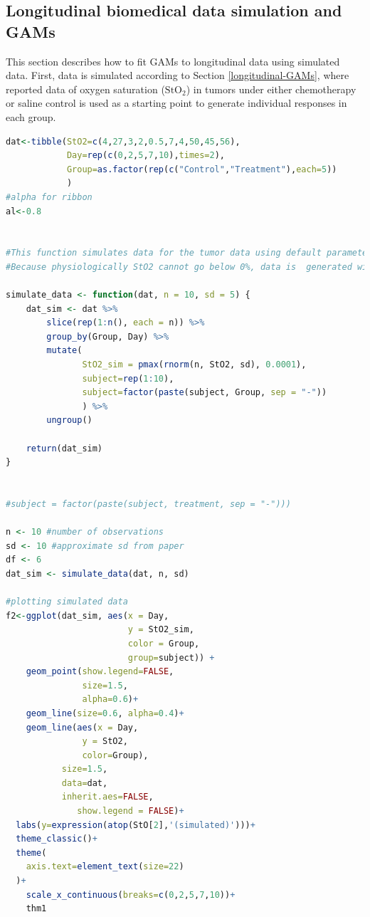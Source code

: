 \documentclass[
]{article}
\begin{document}
\hypertarget{tumor-data-simulation}{%
\subsection{Longitudinal biomedical data simulation and GAMs}\label{tumor-data-simulation}}

This section describes how to fit GAMs to longitudinal data using simulated data. First, data is simulated according to Section \ref{longitudinal-GAMs}, where reported data of oxygen saturation (\(\mbox{StO}_2\)) in tumors under either chemotherapy or saline control is used as a starting point to generate individual responses in each group.

\begin{lstlisting}[language=R]
dat<-tibble(StO2=c(4,27,3,2,0.5,7,4,50,45,56),
            Day=rep(c(0,2,5,7,10),times=2),
            Group=as.factor(rep(c("Control","Treatment"),each=5))
            )
#alpha for ribbon
al<-0.8


#This function simulates data for the tumor data using default parameters of 10 observations per time point,and Standard deviation (sd) of 5%.
#Because physiologically StO2 cannot go below 0%, data is  generated with a cutoff value of 0.0001 (the "StO2_sim")

simulate_data <- function(dat, n = 10, sd = 5) {
    dat_sim <- dat %>%
        slice(rep(1:n(), each = n)) %>%
        group_by(Group, Day) %>%
        mutate(
               StO2_sim = pmax(rnorm(n, StO2, sd), 0.0001),
               subject=rep(1:10),
               subject=factor(paste(subject, Group, sep = "-"))
               ) %>%
        ungroup()

    return(dat_sim)
}


#subject = factor(paste(subject, treatment, sep = "-")))

n <- 10 #number of observations
sd <- 10 #approximate sd from paper
df <- 6
dat_sim <- simulate_data(dat, n, sd)

#plotting simulated data
f2<-ggplot(dat_sim, aes(x = Day, 
                        y = StO2_sim, 
                        color = Group, 
                        group=subject)) +
    geom_point(show.legend=FALSE,
               size=1.5,
               alpha=0.6)+
    geom_line(size=0.6, alpha=0.4)+
    geom_line(aes(x = Day, 
               y = StO2,
               color=Group),
           size=1.5,
           data=dat,
           inherit.aes=FALSE,
              show.legend = FALSE)+
  labs(y=expression(atop(StO[2],'(simulated)')))+
  theme_classic()+
  theme(
    axis.text=element_text(size=22)
  )+
    scale_x_continuous(breaks=c(0,2,5,7,10))+
    thm1
\end{lstlisting}
\end{document}
